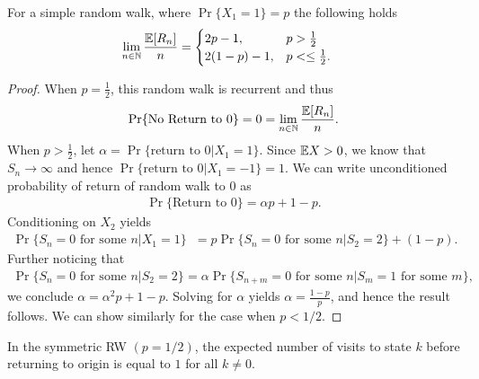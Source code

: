 \documentclass[a4paper,10pt,english]{article}
\begin{document}
\begin{thm} For a simple random walk, where $\Pr\{X_1 = 1\} = p$ the following holds
\begin{align*}
\lim_{n \in \mathbb{N}}\frac{\mathbb{E}[R_n]}{n} &= 
	\begin{cases}
2p - 1, & p > \frac{1}{2}\\
2(1-p)-1, & p <\leq \frac{1}{2}.
	\end{cases}
\end{align*}
\end{thm}
\begin{proof}
When $p=\frac{1}{2}$, this random walk is recurrent and thus
\begin{align*}
\Pr\{\text{No Return to }0\} = 0 = \lim_{n \in \mathbb{N}} \frac{\mathbb{E}[R_n]}{n}.
\end{align*}
When $p > \frac{1}{2}$, let $\alpha = \Pr\{\text{return to } 0|X_1 = 1\}$. Since $\mathbb{E} X > 0$, we know that $S_n \to \infty$ and hence $\Pr\{\text{return to } 0|X_1 = -1\} = 1$. We can write unconditioned probability of return of random walk to $0$ as 
\begin{align*}
\Pr\{\text{Return to }0\} = \alpha p+ 1-p.
\end{align*}
Conditioning on $X_2$ yields 
\begin{align*}
\Pr\{S_n = 0 \text{ for some }n|X_1 = 1\} &= p\Pr\{S_n = 0 \text{ for some }n| S_2  = 2\}  + (1-p).
\end{align*}
Further noticing that 
\begin{align*}
\Pr\{S_n = 0 \text{ for some }n| S_2  = 2\} &= \alpha \Pr\{S_{n+m} = 0 \text{ for some }n| S_m = 1 \text{ for some }m \},
\end{align*}
we conclude $\alpha = \alpha^2 p + 1-p$. 
Solving for $\alpha$ yields $\alpha = \frac{1-p}{p}$, and hence the result follows. We can show similarly for the case when $p < 1/2$.
\end{proof}

\begin{prop}
In the symmetric RW $(p=1/2)$, the expected number of visits to state $k$ before returning to origin is equal to $1$ for all $k \neq 0$.
\end{prop}
\end{document}
